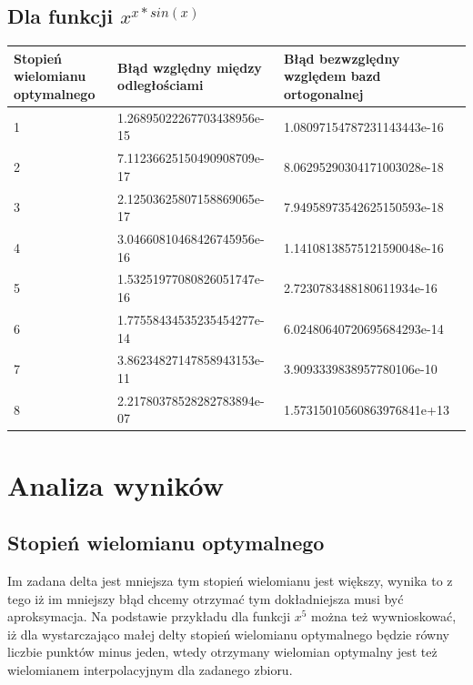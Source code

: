 \documentclass{article}
\begin{document}
\subsection{Dla funkcji $x ^{x * sin(x)}$}
\begin{center}
    \begin{tabular}{ |p{2cm}|p{}|p{}|}
     \hline
     Stopień wielomianu optymalnego &  Błąd względny między odległościami & Błąd bezwzględny względem bazd ortogonalnej\\
	\hline
	1 & 1.26895022267703438956e-15 & 1.08097154787231143443e-16\\
	\hline
	2 & 7.11236625150490908709e-17 & 8.06295290304171003028e-18\\
	\hline
	3 & 2.12503625807158869065e-17 & 7.94958973542625150593e-18\\
	\hline
	4 & 3.04660810468426745956e-16 & 1.14108138575121590048e-16\\
	\hline
	5 & 1.53251977080826051747e-16 & 2.7230783488180611934e-16\\
	\hline
	6 & 1.77558434535235454277e-14 & 6.02480640720695684293e-14\\
	\hline
	7 & 3.86234827147858943153e-11 & 3.9093339838957780106e-10\\
	\hline
	8 & 2.21780378528282783894e-07 & 1.57315010560863976841e+13\\
	\hline
\end{tabular}
\end{center}
\section{Analiza wyników}
\subsection{Stopień wielomianu optymalnego}
Im zadana delta jest mniejsza tym stopień wielomianu jest większy, wynika to z tego iż im mniejszy błąd chcemy otrzymać tym dokładniejsza musi być aproksymacja. Na podstawie przykładu dla funkcji $x^5$ można też wywnioskować, iż dla wystarczająco małej delty stopień wielomianu optymalnego  będzie równy liczbie punktów minus jeden, wtedy otrzymany wielomian optymalny jest też wielomianem interpolacyjnym dla zadanego zbioru.
\end{document}
